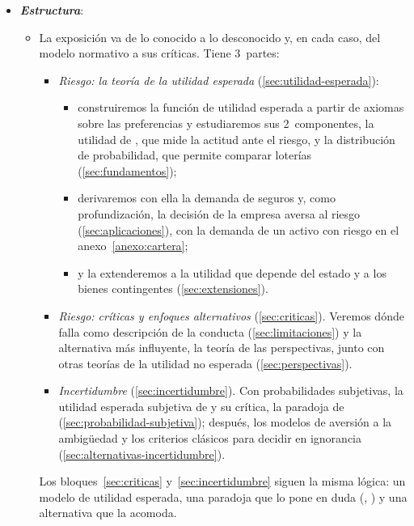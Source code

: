 \documentclass[11pt]{article}
\begin{document}
\begin{itemize}
\item \textbf{\emph{Estructura}}:
  \begin{itemize}
  \item La exposición va de lo conocido a lo desconocido y, en cada caso, del modelo normativo a sus críticas. Tiene 3~partes:
  \begin{itemize}
  \item \emph{Riesgo: la teoría de la utilidad esperada} (\ref{sec:utilidad-esperada}):
    \begin{itemize}
    \item construiremos la función de utilidad esperada a partir de axiomas sobre las preferencias y estudiaremos sus 2~componentes, la utilidad de , que mide la actitud ante el riesgo, y la distribución de probabilidad, que permite comparar loterías (\ref{sec:fundamentos});
    \item derivaremos con ella la demanda de seguros y, como profundización, la decisión de la empresa aversa al riesgo (\ref{sec:aplicaciones}), con la demanda de un activo con riesgo en el anexo~\ref{anexo:cartera};
    \item y la extenderemos a la utilidad que depende del estado y a los bienes contingentes (\ref{sec:extensiones}).
    \end{itemize}
  \item \emph{Riesgo: críticas y enfoques alternativos} (\ref{sec:criticas}). Veremos dónde falla como descripción de la conducta (\ref{sec:limitaciones}) y la alternativa más influyente, la teoría de las perspectivas, junto con otras teorías de la utilidad no esperada (\ref{sec:perspectivas}).
  \item \emph{Incertidumbre} (\ref{sec:incertidumbre}). Con probabilidades subjetivas, la utilidad esperada subjetiva de  y su crítica, la paradoja de  (\ref{sec:probabilidad-subjetiva}); después, los modelos de aversión a la ambigüedad y los criterios clásicos para decidir en ignorancia (\ref{sec:alternativas-incertidumbre}).
  \end{itemize}
  Los bloques~\ref{sec:criticas} y~\ref{sec:incertidumbre} siguen la misma lógica: un modelo de utilidad esperada, una paradoja que lo pone en duda (, ) y una alternativa que la acomoda.
  \end{itemize}
\end{itemize}
\end{document}
